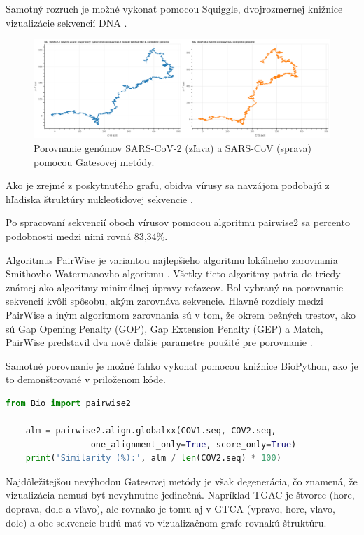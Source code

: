 Samotný rozruch je možné vykonať pomocou Squiggle, dvojrozmernej knižnice vizualizácie sekvencií DNA \cite{Lee2018}.
\begin{figure}[!ht]
	\centering
	\includegraphics[width=1\textwidth]{figures/comprasion.png}
	\caption{Porovnanie genómov SARS-CoV-2 (zľava) a SARS-CoV (sprava) pomocou Gatesovej metódy.\label{o:latex_friendly_zone}}
\end{figure}

Ako je zrejmé z poskytnutého grafu, obidva vírusy sa navzájom podobajú z hľadiska štruktúry nukleotidovej sekvencie \cite{2d}.

Po spracovaní sekvencií oboch vírusov pomocou algoritmu pairwise2 sa percento podobnosti medzi nimi rovná 83,34\%.

Algoritmus PairWise je variantou najlepšieho algoritmu lokálneho zarovnania Smithovho-Watermanovho algoritmu \cite{pairwise}.
Všetky tieto algoritmy patria do triedy známej ako algoritmy minimálnej úpravy reťazcov.
Bol vybraný na porovnanie sekvencií kvôli spôsobu, akým zarovnáva sekvencie.
Hlavné rozdiely medzi PairWise a iným algoritmom zarovnania sú v tom, že okrem bežných trestov, ako sú Gap Opening Penalty (GOP), Gap Extension Penalty (GEP) a Match, PairWise predstavil dva nové ďalšie parametre použité pre porovnanie \cite{pairwise}.

Samotné porovnanie je možné ľahko vykonať pomocou knižnice BioPython, ako je to demonštrované v priloženom kóde.
\begin{lstlisting}[language=Python, caption=Algoritmus Pairwise2 využívajúci BioPython; COV1.seq a COV2.seq sú sekvencie DNA vírusov SARS-CoV a SARS-CoV-2. Poskytujú sa dva argumenty samotného zarovnania aby sa znížila komlexita a čas zosúladenia.]
    from Bio import pairwise2

    alm = pairwise2.align.globalxx(COV1.seq, COV2.seq,
                 one_alignment_only=True, score_only=True)
    print('Similarity (%):', alm / len(COV2.seq) * 100)
\end{lstlisting}

Najdôležitejšou nevýhodou Gatesovej metódy je však degenerácia, čo znamená, že vizualizácia nemusí byť nevyhnutne jedinečná.
Napríklad TGAC je štvorec (hore, doprava, dole a vľavo), ale rovnako je tomu aj v GTCA (vpravo, hore, vľavo, dole) a obe sekvencie budú mať vo vizualizačnom grafe rovnakú štruktúru.

